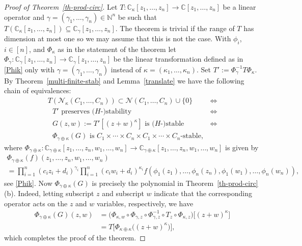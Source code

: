 \documentclass[10pt,reqno]{amsart}
\theoremstyle{plain}
\theoremstyle{definition}
\theoremstyle{remark}
\numberwithin{equation}{section}
\newcommand{\NN}{\mathbb{N}}
\newcommand{\NV}{\mathcal{N}}
\newcommand{\CC}{\mathbb{C}}
\begin{document}
\begin{proof}[Proof of Theorem~\ref{th-prod-circ}] 
Let $T: \CC_\kappa[z_1,\ldots, z_n] \rightarrow \CC[z_1,\ldots, z_n]$ 
be a linear operator and $\gamma=(\gamma_1,\ldots,\gamma_n)\in\NN^n$ 
be such that 
$T(\CC_\kappa[z_1,\ldots, z_n])\subseteq \CC_\gamma[z_1,\ldots, z_n]$. 
The theorem is trivial if the range of $T$ has dimension at most one so we may 
assume that this is not the case. With $\phi_i$, $i\in [n]$, and $\Phi_\kappa$ 
as in the statement of the theorem let 
$\Phi_\gamma:\CC_\gamma[z_1,\ldots, z_n] \rightarrow 
\CC_\gamma[z_1,\ldots, z_n]$ be the linear transformation defined as in 
\eqref{Phik} only with $\gamma=(\gamma_1,\ldots,\gamma_n)$ instead of 
$\kappa=(\kappa_1,\ldots,\kappa_n)$. Set $T':=\Phi^{-1}_\gamma T \Phi_\kappa$. 
By Theorem~\ref{multi-finite-stab} and 
Lemma~\ref{translate} we have the following chain of equivalences:
\begin{equation*}
\begin{split}
\text{$T(\NV_\kappa(C_1,\ldots,C_n))\subset \NV(C_1,\ldots,C_n)\cup \{0\}$}
&\Longleftrightarrow\\
\text{ $T'$ preserves ($H$-)stability}&\Longleftrightarrow\\ 
\text{ $G(z,w):=T'[(z+w)^\kappa]$ is ($H$-)stable }&\Longleftrightarrow\\ 
\text{ $\Phi_{\gamma \oplus \kappa} (G)$ is 
$C_1\times \cdots \times C_n\times C_1\times \cdots \times C_n$-stable},&
\end{split}
\end{equation*} 
where $\Phi_{\gamma \oplus \kappa}:
\CC_{\gamma \oplus \kappa}[z_1,\ldots,z_n,w_1,\ldots,w_n]\to
\CC_{\gamma \oplus \kappa}[z_1,\ldots,z_n,w_1,\ldots,w_n]$ is given by
\begin{multline*}
\Phi_{\gamma \oplus \kappa}(f)(z_1,\ldots,z_n,w_1,\ldots,w_n)\\
=\prod_{i=1}^{n}(c_iz_i+d_i)^{\gamma_i}
\prod_{i=1}^{n}(c_iw_i+d_i)^{\kappa_i}
f(\phi_1(z_1),\ldots,\phi_n(z_n),\phi_1(w_1),\ldots,\phi_n(w_n)),
\end{multline*}
see \eqref{Phik}. Now $\Phi_{\gamma \oplus \kappa} (G)$ is precisely the 
polynomial in 
Theorem~\ref{th-prod-circ} (b). Indeed, letting subscript $z$ and subscript 
$w$ indicate that the 
corresponding operator acts on the $z$ and $w$ variables, respectively, we have
\begin{equation*}
\begin{split}
\Phi_{\gamma \oplus \kappa}(G)(z,w)&
=\big(\Phi_{\kappa,w} \circ \Phi_{\gamma,z} 
\circ \Phi^{-1}_{\gamma,z} \circ T_z \circ \Phi_{\kappa,z}\big) 
\Big[(z+w)^\kappa\Big]\\
&= T\Big[ \Phi_{\kappa \oplus \kappa}\Big( (z+w)^\kappa \Big) \Big],
\end{split}
\end{equation*}
which completes the proof of the theorem.
\end{proof}
\end{document}

